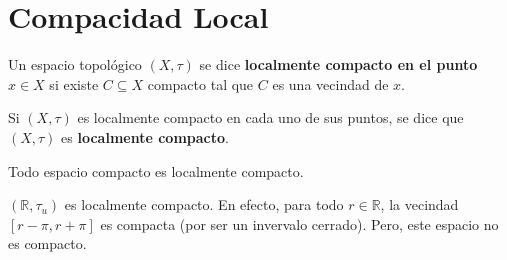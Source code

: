 \documentclass[12pt]{report}
\theoremstyle{largebreak}
\begin{document}
    \section{Compacidad Local}

    \begin{mydef}
        Un espacio topológico $(X,\tau)$ se dice \textbf{localmente compacto en el punto $x\in X$} si existe $C\subseteq X$ compacto tal que $C$ es una vecindad de $x$.

        Si $(X,\tau)$ es localmente compacto en cada uno de sus puntos, se dice que $(X,\tau)$ es \textbf{ localmente compacto}.
    \end{mydef}

    \begin{obs}
        Todo espacio compacto es localmente compacto.
    \end{obs}

    \begin{exa}
        $(\mathbb{R},\tau_u)$ es localmente compacto. En efecto, para todo $r\in\mathbb{R}$, la vecindad $[r-\pi,r+\pi]$ es compacta (por ser un invervalo cerrado). Pero, este espacio no es compacto.
    \end{exa}
\end{document}
